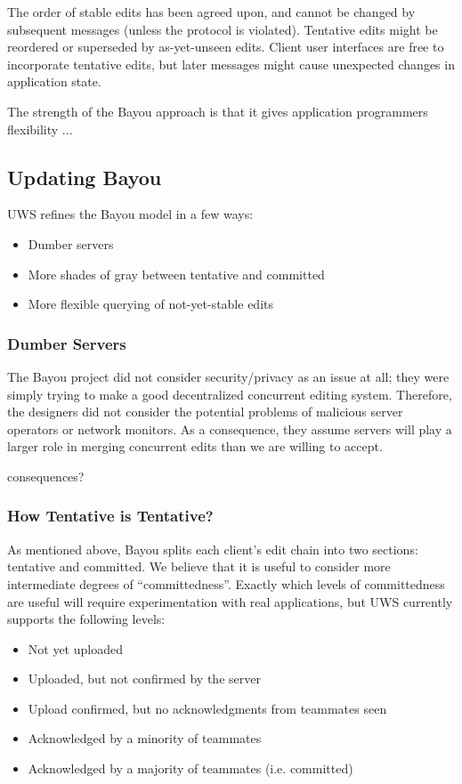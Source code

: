 \documentclass{article}
\begin{document}
The order of stable edits has been agreed upon, and cannot be changed by subsequent messages (unless the protocol is violated).
Tentative edits might be reordered or superseded by as-yet-unseen edits.
Client user interfaces are free to incorporate tentative edits, but later messages might cause unexpected changes in application state.


The strength of the Bayou approach is that it gives application programmers flexibility ...

\subsection{Updating Bayou}

UWS refines the Bayou model in a few ways:

\begin{itemize}
\item Dumber servers
\item More shades of gray between tentative and committed
\item More flexible querying of not-yet-stable edits
\end{itemize}

\subsubsection{Dumber Servers}

The Bayou project did not consider security/privacy as an issue at all; they were simply trying to make a good decentralized concurrent editing system.
Therefore, the designers did not consider the potential problems of malicious server operators or network monitors.
As a consequence, they assume servers will play a larger role in merging concurrent edits than we are willing to accept.

consequences?

\subsubsection{How Tentative is Tentative?}

As mentioned above, Bayou splits each client's edit chain into two sections: tentative and committed.
We believe that it is useful to consider more intermediate degrees of ``committedness''.
Exactly which levels of committedness are useful will require experimentation with real applications, but UWS currently supports the following levels:

\begin{itemize}
\item Not yet uploaded
\item Uploaded, but not confirmed by the server
\item Upload confirmed, but no acknowledgments from teammates seen
\item Acknowledged by a minority of teammates
\item Acknowledged by a majority of teammates (i.e. committed)
\end{itemize}
\end{document}
